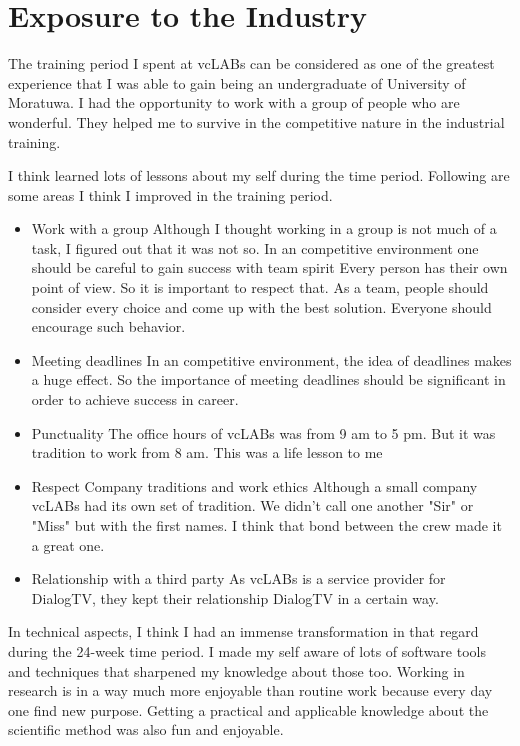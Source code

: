 \section{Exposure to the Industry}

The training period I spent at vcLABs can be considered as one of the greatest experience that I was able to gain being an  undergraduate of University of Moratuwa. I had the opportunity to work with a group of people who are wonderful. They helped me to survive in the competitive nature in the industrial training.

I think learned lots of lessons about my self during the time period. Following are some areas I think I improved in the training period.

\begin{itemize}
\item Work with a group
\subitem Although I thought working in a group is not much of a task, I figured out that it was not so. In an competitive environment one should be careful to gain success with team spirit
\subitem Every person has their own point of view. So it is important to respect that. As a team, people should consider every choice and come up with the best solution. Everyone should encourage such behavior.

\item Meeting deadlines
\subitem In an competitive environment, the idea of deadlines makes a huge effect. So the importance of meeting deadlines should be significant in order to achieve success in career.

\item Punctuality 
\subitem The office hours of vcLABs was from 9 am to 5 pm. But it was tradition to work from 8 am. This was a life lesson to me

\item Respect Company traditions and work ethics
\subitem Although a small company vcLABs had its own set of tradition. We didn't call one another "Sir" or "Miss" but with the first names. I think that bond between the crew made it a great one.

\item Relationship with a third party
\subitem As vcLABs is a service provider for DialogTV, they kept their relationship DialogTV in a certain way.
\end{itemize}

In technical aspects, I think I had an immense transformation in that regard during the 24-week time period. I made my self  aware of lots of software tools and techniques that sharpened my knowledge about those too. Working in research is in a way much more enjoyable than routine work because every day one find new purpose. Getting a practical and applicable knowledge about the scientific method was also fun and enjoyable.

